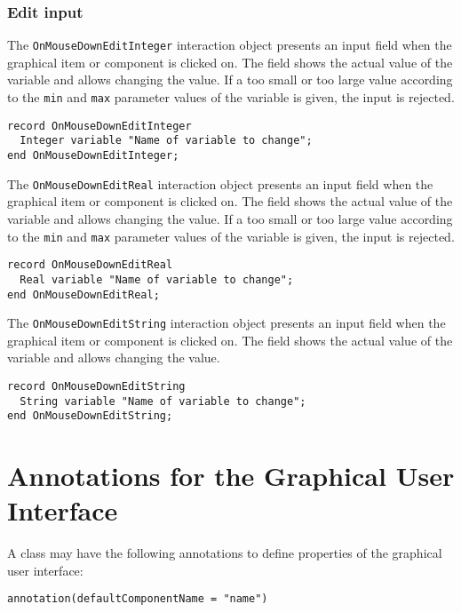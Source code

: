\subsubsection{Edit input}

The \lstinline!OnMouseDownEditInteger! interaction object presents an input field
when the graphical item or component is clicked on. The field shows the
actual value of the variable and allows changing the value. If a too
small or too large value according to the \lstinline!min! and \lstinline!max! parameter values
of the variable is given, the input is rejected.

\begin{lstlisting}[language=modelica]
record OnMouseDownEditInteger
  Integer variable "Name of variable to change";
end OnMouseDownEditInteger;
\end{lstlisting}
The \lstinline!OnMouseDownEditReal! interaction object presents an input field when
the graphical item or component is clicked on. The field shows the
actual value of the variable and allows changing the value. If a too
small or too large value according to the \lstinline!min! and \lstinline!max! parameter values
of the variable is given, the input is rejected.

\begin{lstlisting}[language=modelica]
record OnMouseDownEditReal
  Real variable "Name of variable to change";
end OnMouseDownEditReal;
\end{lstlisting}
The \lstinline!OnMouseDownEditString! interaction object presents an input field
when the graphical item or component is clicked on. The field shows the
actual value of the variable and allows changing the value.

\begin{lstlisting}[language=modelica]
record OnMouseDownEditString
  String variable "Name of variable to change";
end OnMouseDownEditString;
\end{lstlisting}
\section{Annotations for the Graphical User Interface}

A class may have the following annotations to define properties of the
graphical user interface:
\begin{lstlisting}[language=modelica]
 annotation(defaultComponentName = "name")
\end{lstlisting}

